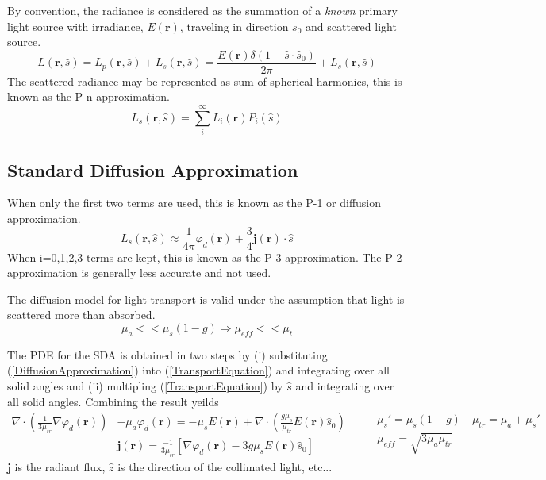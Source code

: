 \documentclass{article}         %
\theoremstyle{definition}
\theoremstyle{remark}
\newcommand{\eqn}[1]{(\ref{#1})}
\begin{document}
By convention, the radiance is considered as the summation of a
\textit{known} primary light source with irradiance, $E(\mathbf{r})$, traveling in
direction $s_0$ and scattered light source.
\[
  L(\mathbf{r},\hat{s}) = L_p(\mathbf{r},\hat{s}) + L_s(\mathbf{r},\hat{s})
               = \frac{E(\mathbf{r})  \delta( 1 - \hat{s} \cdot \hat{s}_0)}{
2\pi}  + L_s(\mathbf{r},\hat{s})
\]
The scattered radiance may be represented as sum of spherical harmonics,
this is known as the P-n approximation\cite{Welch95,Modest2003}. 
\[
  L_s(\mathbf{r},\hat{s})  = \sum^\infty_i L_i(\mathbf{r}) P_i(\hat{s})
\]
\subsection{Standard Diffusion Approximation}
{\color{red}
When only the first two terms are used, this is known as the
P-1\cite{Modest2003} or diffusion approximation\cite{Modest2003}. 
}
\begin{equation} \label{DiffusionApproximation}
  L_s(\mathbf{r},\hat{s})  \approx \frac{1}{4 \pi} \varphi_d(\mathbf{r}) + \frac{3}{4} \mathbf{j}(\mathbf{r}) \cdot \hat{s}
\end{equation}
When i=0,1,2,3 terms are kept, this is known as the P-3
approximation. The P-2 approximation is generally less accurate and not
used\cite{Modest2003}.

The diffusion model for light transport is valid under the assumption
that light is scattered more than absorbed.
\[
\mu_a << \mu_s(1-g)  \Rightarrow \mu_{eff} << \mu_t
\]

The PDE for the SDA is obtained in two steps by (i) substituting \eqn{DiffusionApproximation}
into \eqn{TransportEquation} and integrating over all solid angles and (ii)
multipling \eqn{TransportEquation}  by $\hat{s}$ and integrating over all
solid angles. Combining the result yeilds
\[ \begin{split}
\nabla\cdot \left( \frac{1}{3 \mu_{tr} } \nabla \varphi_d(\mathbf{r}) \right)  & - \mu_a \varphi_d(\mathbf{r}) 
= 
- \mu_s E(\mathbf{r})
+ \nabla  \cdot  \left( \frac{g \mu_s }{\mu_{tr}} E(\mathbf{r})  \hat{s}_0 \right) 
\\
& \mathbf{j}(\mathbf{r}) = \frac{-1}{3 \mu_{tr}} 
\left[
 \nabla \varphi_d(\mathbf{r}) - 3 g \mu_s E(\mathbf{r}) \hat{s}_0
\right]
\end{split}
\qquad
\begin{split}
\mu_s' = \mu_s (1-g)
\quad
\mu_{tr} = \mu_a + \mu_s'
\\
\mu_{eff} = \sqrt{3\mu_a  \mu_{tr}}
\end{split}
\]
$\mathbf{j}$ is the radiant flux, $\hat{z}$ is the direction of the collimated light, etc...
\end{document}
